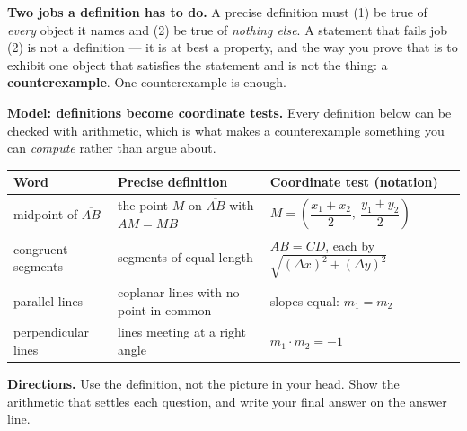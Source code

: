 \documentclass[12pt]{article}
\begin{document}

\noindent\textbf{Two jobs a definition has to do.} \small A precise definition
must (1) be true of \emph{every} object it names and (2) be true of
\emph{nothing else}. A statement that fails job (2) is not a definition --- it is
at best a property, and the way you prove that is to exhibit one object that
satisfies the statement and is not the thing: a \textbf{counterexample}. One
counterexample is enough.\normalsize

\smallskip
\noindent\textbf{Model: definitions become coordinate tests.} Every definition
below can be checked with arithmetic, which is what makes a counterexample
something you can \emph{compute} rather than argue about.

\begin{center}\small
\begin{tabular}{|p{3.0cm}|p{5.2cm}|p{4.6cm}|}
\hline
\textbf{Word} & \textbf{Precise definition} & \textbf{Coordinate test (notation)} \\
\hline
midpoint of $\overline{AB}$ & the point $M$ on $\overline{AB}$ with $AM = MB$ &
$M = \left(\dfrac{x_1+x_2}{2},\ \dfrac{y_1+y_2}{2}\right)$ \\
\hline
congruent segments & segments of equal length &
$AB = CD$, each by $\sqrt{(\Delta x)^2 + (\Delta y)^2}$ \\
\hline
parallel lines & coplanar lines with no point in common &
slopes equal: $m_1 = m_2$ \\
\hline
perpendicular lines & lines meeting at a right angle &
$m_1 \cdot m_2 = -1$ \\
\hline
\end{tabular}
\end{center}

\noindent\textbf{Directions.} Use the definition, not the picture in your head.
Show the arithmetic that settles each question, and write your final answer on
the answer line.


\end{document}
